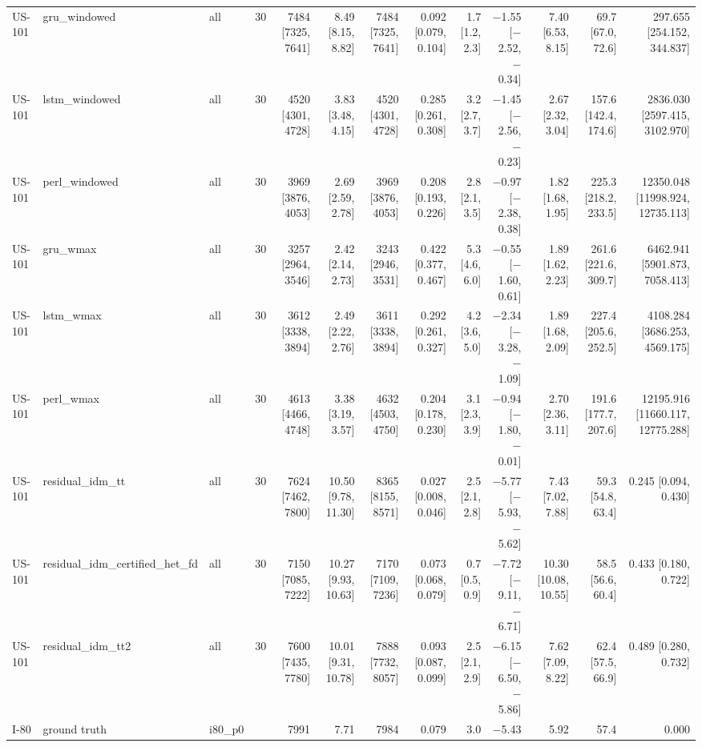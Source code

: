 \begin{table}[htbp]
{\begin{tabular}{lllrrrrrrrrrr}
US-101 & gru\_windowed & all & 30 & 7484 [7325, 7641] & 8.49 [8.15, 8.82] & 7484 [7325, 7641] & 0.092 [0.079, 0.104] & 1.7 [1.2, 2.3] & $-$1.55 [$-$2.52, $-$0.34] & 7.40 [6.53, 8.15] & 69.7 [67.0, 72.6] & 297.655 [254.152, 344.837] \\
US-101 & lstm\_windowed & all & 30 & 4520 [4301, 4728] & 3.83 [3.48, 4.15] & 4520 [4301, 4728] & 0.285 [0.261, 0.308] & 3.2 [2.7, 3.7] & $-$1.45 [$-$2.56, $-$0.23] & 2.67 [2.32, 3.04] & 157.6 [142.4, 174.6] & 2836.030 [2597.415, 3102.970] \\
US-101 & perl\_windowed & all & 30 & 3969 [3876, 4053] & 2.69 [2.59, 2.78] & 3969 [3876, 4053] & 0.208 [0.193, 0.226] & 2.8 [2.1, 3.5] & $-$0.97 [$-$2.38, 0.38] & 1.82 [1.68, 1.95] & 225.3 [218.2, 233.5] & 12350.048 [11998.924, 12735.113] \\
US-101 & gru\_wmax & all & 30 & 3257 [2964, 3546] & 2.42 [2.14, 2.73] & 3243 [2946, 3531] & 0.422 [0.377, 0.467] & 5.3 [4.6, 6.0] & $-$0.55 [$-$1.60, 0.61] & 1.89 [1.62, 2.23] & 261.6 [221.6, 309.7] & 6462.941 [5901.873, 7058.413] \\
US-101 & lstm\_wmax & all & 30 & 3612 [3338, 3894] & 2.49 [2.22, 2.76] & 3611 [3338, 3894] & 0.292 [0.261, 0.327] & 4.2 [3.6, 5.0] & $-$2.34 [$-$3.28, $-$1.09] & 1.89 [1.68, 2.09] & 227.4 [205.6, 252.5] & 4108.284 [3686.253, 4569.175] \\
US-101 & perl\_wmax & all & 30 & 4613 [4466, 4748] & 3.38 [3.19, 3.57] & 4632 [4503, 4750] & 0.204 [0.178, 0.230] & 3.1 [2.3, 3.9] & $-$0.94 [$-$1.80, $-$0.01] & 2.70 [2.36, 3.11] & 191.6 [177.7, 207.6] & 12195.916 [11660.117, 12775.288] \\
US-101 & residual\_idm\_tt & all & 30 & 7624 [7462, 7800] & 10.50 [9.78, 11.30] & 8365 [8155, 8571] & 0.027 [0.008, 0.046] & 2.5 [2.1, 2.8] & $-$5.77 [$-$5.93, $-$5.62] & 7.43 [7.02, 7.88] & 59.3 [54.8, 63.4] & 0.245 [0.094, 0.430] \\
US-101 & residual\_idm\_certified\_het\_fd & all & 30 & 7150 [7085, 7222] & 10.27 [9.93, 10.63] & 7170 [7109, 7236] & 0.073 [0.068, 0.079] & 0.7 [0.5, 0.9] & $-$7.72 [$-$9.11, $-$6.71] & 10.30 [10.08, 10.55] & 58.5 [56.6, 60.4] & 0.433 [0.180, 0.722] \\
US-101 & residual\_idm\_tt2 & all & 30 & 7600 [7435, 7780] & 10.01 [9.31, 10.78] & 7888 [7732, 8057] & 0.093 [0.087, 0.099] & 2.5 [2.1, 2.9] & $-$6.15 [$-$6.50, $-$5.86] & 7.62 [7.09, 8.22] & 62.4 [57.5, 66.9] & 0.489 [0.280, 0.732] \\
I-80 & ground truth & i80\_p0 &  & 7991 & 7.71 & 7984 & 0.079 & 3.0 & $-$5.43 & 5.92 & 57.4 & 0.000 \\

\end{tabular}}
\end{table}
